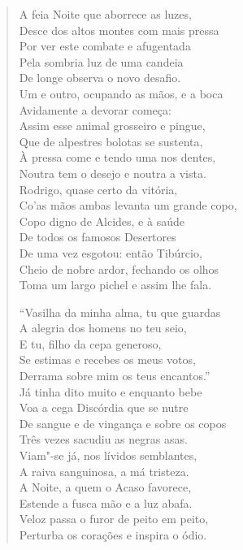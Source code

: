\begin{verse}
A feia Noite que aborrece as luzes,\\
Desce dos altos montes com mais pressa\\
Por ver este combate e afugentada\\
Pela sombria luz de uma candeia\\
De longe observa o novo desafio.\\
Um e outro, ocupando as mãos, e a boca\\
Avidamente a devorar começa:\\ 
Assim esse animal grosseiro e pingue,\\
Que de alpestres bolotas se sustenta,\\
À pressa come e tendo uma nos dentes,\\
Noutra tem o desejo e noutra a vista.\\
Rodrigo, quase certo da vitória,\\
Co'as mãos ambas levanta um grande copo,\\
Copo digno de Alcides, e à saúde\\ 			\index{\Alcid}	%
De todos os famosos Desertores\\
De uma vez esgotou: então Tibúrcio,\\
Cheio de nobre ardor, fechando os olhos\\ 
Toma um largo pichel e assim lhe fala. \\[10pt]	\index{\Pichel}


``Vasilha da minha alma, tu que guardas\\
A alegria dos homens no teu seio,\\
E tu, filho da cepa generoso,\\		\index{\Cepa}
Se estimas e recebes os meus votos,\\
Derrama sobre mim os teus encantos.''\\
Já tinha dito muito e enquanto bebe\\
Voa a cega Discórdia que se nutre\\
De sangue e de vingança e sobre os copos\\
Três vezes sacudiu as negras asas.\\
Viam"-se já, nos lívidos semblantes,\\
A raiva sanguinosa, a má tristeza.\\
A Noite, a quem o Acaso favorece,\\		\index{\Acaso}
Estende a fusca mão e a luz abafa.\\
Veloz passa o furor de peito em peito,\\
Perturba os corações e inspira o ódio. \\[10pt]



\end{verse}
